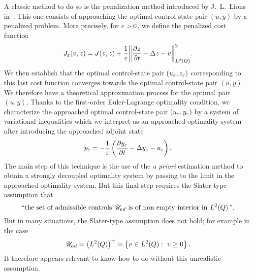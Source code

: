 A classic method to do so is the penalization method introduced by
J.~L.~Lions in~\cite{lions2}. This one consists of approaching the optimal
control-state pair $(u,y)$ by a penalized problem. More precisely, for
$\varepsilon > 0$, we define the penalized cost function
\begin{equation*}\label{eq:penalized-cost-function}
    J_{\veps}\!\left({v,z}\right) = J(v,z) + \dfrac{1}{\veps}\normecq{%
        \primetemps{z} - \Delta z - v
    }.
\end{equation*}
We then establish that the optimal control-state pair
$\left({u_{\varepsilon},z_{\varepsilon}}\right)$ corresponding to this last cost
function converges towards the optimal control-state pair $(u,y)$. We
therefore have a theoretical approximation process for the optimal pair
$(u,y)$. Thanks to the first-order Euler-Lagrange optimality condition, we
characterize the approached optimal control-state pair
$\left({u_{\varepsilon},y_{\varepsilon}}\right)$ by a system of variational
inequalities which we interpret as an approached optimality system after
introducing the approached adjoint state
\begin{equation*}
    p_{\veps} = -\dfrac{1}{\veps}\left({%
        \primetemps{y_{\veps}} - \Delta y_{\veps} - u_{\veps}
    }\right).
\end{equation*}
The main step of this technique is the use of the \textit{a priori}
estimation method to obtain a strongly decoupled optimality system by
passing to the limit in the approached optimality system. But this final
step requires the Slater-type assumption that
\begin{equation}\label{eq:slater-type-assumption}
    \text{“the set of admissible controls }{\mathscr{U}}_{ad}\ \text{is of non
    empty interior in}\ L^{2}\!\left({Q}\right)\text{”}.
\end{equation}
But in many situations, the Slater-type assumption does not hold; for
example in the case
\begin{equation*}
    \uad = {\left({\Ldeux{Q}}\right)}^{+} = \left\{{%
        v\in\Ldeux{Q}:\ v\geq 0
    }\right\}.
\end{equation*}
It therefore appears relevant to know how to do without this unrealistic
assumption.

